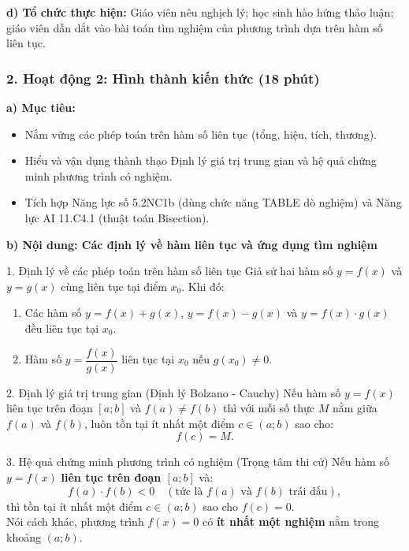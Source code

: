 \documentclass[12pt, a4paper]{article}
\begin{document}
\noindent \textbf{d) Tổ chức thực hiện:}
Giáo viên nêu nghịch lý; học sinh hào hứng thảo luận; giáo viên dẫn dắt vào bài toán tìm nghiệm của phương trình dựa trên hàm số liên tục.

\subsubsection*{2. Hoạt động 2: Hình thành kiến thức (18 phút)}

\noindent \textbf{a) Mục tiêu:}
\begin{itemize}[leftmargin=0.6cm]
    \item Nắm vững các phép toán trên hàm số liên tục (tổng, hiệu, tích, thương).
    \item Hiểu và vận dụng thành thạo Định lý giá trị trung gian và hệ quả chứng minh phương trình có nghiệm.
    \item Tích hợp Năng lực số 5.2NC1b (dùng chức năng TABLE dò nghiệm) và Năng lực AI 11.C4.1 (thuật toán Bisection).
\end{itemize}

\noindent \textbf{b) Nội dung: Các định lý về hàm liên tục và ứng dụng tìm nghiệm}

\begin{pedabox}{1. Định lý về các phép toán trên hàm số liên tục}
Giả sử hai hàm số $y = f(x)$ và $y = g(x)$ cùng liên tục tại điểm $x_0$. Khi đó:
\begin{enumerate}[leftmargin=0.6cm]
    \item Các hàm số $y = f(x) + g(x)$, $y = f(x) - g(x)$ và $y = f(x) \cdot g(x)$ đều liên tục tại $x_0$.
    \item Hàm số $y = \dfrac{f(x)}{g(x)}$ liên tục tại $x_0$ nếu $g(x_0) \neq 0$.
\end{enumerate}
\end{pedabox}

\begin{pedabox}{2. Định lý giá trị trung gian (Định lý Bolzano - Cauchy)}
Nếu hàm số $y = f(x)$ liên tục trên đoạn $[a; b]$ và $f(a) \neq f(b)$ thì với mỗi số thực $M$ nằm giữa $f(a)$ và $f(b)$, luôn tồn tại ít nhất một điểm $c \in (a; b)$ sao cho:
$$f(c) = M.$$
\end{pedabox}

\begin{pedabox}{3. Hệ quả chứng minh phương trình có nghiệm (Trọng tâm thi cử)}
Nếu hàm số $y = f(x)$ \textbf{liên tục trên đoạn $[a; b]$} và:
$$f(a) \cdot f(b) < 0 \quad (\text{tức là } f(a) \text{ và } f(b) \text{ trái dấu}),$$
thì tồn tại ít nhất một điểm $c \in (a; b)$ sao cho $f(c) = 0$.\\
Nói cách khác, phương trình $f(x) = 0$ có \textbf{ít nhất một nghiệm} nằm trong khoảng $(a; b)$.
\end{pedabox}
\end{document}
